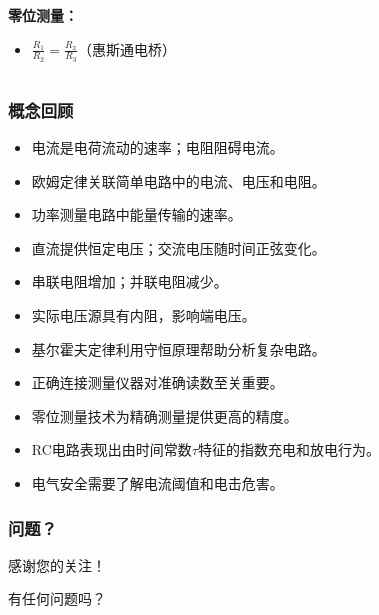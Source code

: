 \documentclass{beamer}
\begin{document}
\begin{frame}
\begin{columns}
\begin{column}{0.5\textwidth}
            \textbf{零位测量：}
            \begin{itemize}
                \item $\frac{R_1}{R_2} = \frac{R_x}{R_3}$（惠斯通电桥）
            \end{itemize}
        \end{column}
    \end{columns}
\end{frame}

\begin{frame}
    \frametitle{概念回顾}
    \begin{itemize}
        \item 电流是电荷流动的速率；电阻阻碍电流。
        \item 欧姆定律关联简单电路中的电流、电压和电阻。
        \item 功率测量电路中能量传输的速率。
        \item 直流提供恒定电压；交流电压随时间正弦变化。
        \item 串联电阻增加；并联电阻减少。
        \item 实际电压源具有内阻，影响端电压。
        \item 基尔霍夫定律利用守恒原理帮助分析复杂电路。
        \item 正确连接测量仪器对准确读数至关重要。
        \item 零位测量技术为精确测量提供更高的精度。
        \item RC电路表现出由时间常数$\tau$特征的指数充电和放电行为。
        \item 电气安全需要了解电流阈值和电击危害。
    \end{itemize}
\end{frame}

\begin{frame}
    \frametitle{问题？}
    \begin{center}
        \Large 感谢您的关注！
        
        \vspace{1cm}
        
        有任何问题吗？
    \end{center}
\end{frame}
\end{document}
